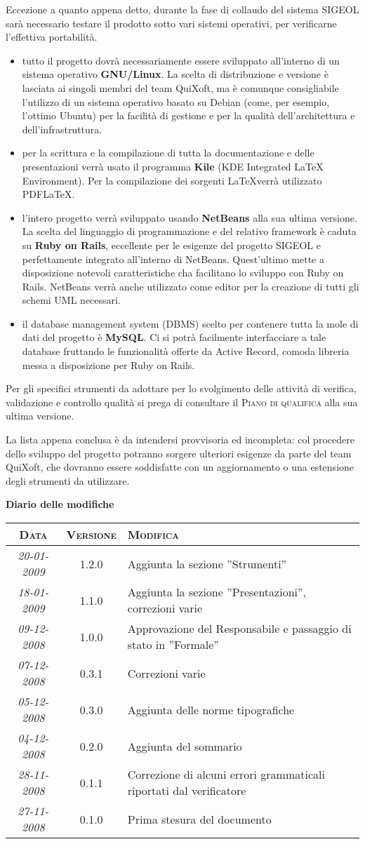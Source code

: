 \documentclass[11pt,a4paper]{article}
\newcommand{\modifiche} 
{
\newpage
\begin{center}
\textbf{Diario delle modifiche} \\
\bigskip
\begin{tabular}{|c|c|p{0.62\textwidth}|}
\hline
\textsc{Data} & \textsc{Versione} & \textsc{Modifica} \\
\hline
\hline
\textit{20-01-2009} & 1.2.0 & Aggiunta la sezione ''Strumenti''\\
\hline
\textit{18-01-2009} & 1.1.0 & Aggiunta la sezione ''Presentazioni'', correzioni varie\\
\hline
\textit{09-12-2008} & 1.0.0 & Approvazione del Responsabile e passaggio di stato in ''Formale''\\
\hline
\textit{07-12-2008} & 0.3.1 & Correzioni varie \\
\hline
\textit{05-12-2008} & 0.3.0 & Aggiunta delle norme tipografiche \\
\hline
\textit{04-12-2008} & 0.2.0 & Aggiunta del sommario \\
\hline
\textit{28-11-2008} & 0.1.1 & Correzione di alcuni errori grammaticali riportati dal verificatore \\
\hline
\textit{27-11-2008} & 0.1.0 & Prima stesura del documento \\
\hline
\end{tabular}
\end{center}
}
\begin{document}
Eccezione a quanto appena detto, durante la fase di collaudo del sistema SIGEOL sarà necessario testare il prodotto sotto vari sistemi operativi, per verificarne l'effettiva portabilità.
\begin{itemize}
 \item tutto il progetto dovrà necessariamente essere sviluppato all'interno di un sistema operativo \textbf{GNU/Linux}. La scelta di distribuzione e versione è lasciata ai singoli membri del team QuiXoft, ma è comunque consigliabile l'utilizzo di un sistema operativo basato su Debian (come, per esempio, l'ottimo Ubuntu) per la facilità di gestione e per la qualità dell'architettura e dell'infrastruttura.
 \item per la scrittura e la compilazione di tutta la documentazione e delle presentazioni verrà usato il programma \textbf{Kile} (KDE Integrated LaTeX Environment). Per la compilazione dei sorgenti \LaTeX \space verrà utilizzato PDFLaTeX.
 \item l'intero progetto verrà sviluppato usando \textbf{NetBeans} alla sua ultima versione. La scelta del linguaggio di programmazione e del relativo framework è caduta su \textbf{Ruby on Rails}, eccellente per le esigenze del progetto SIGEOL e perfettamente integrato all'interno di NetBeans. Quest'ultimo mette a disposizione notevoli caratteristiche cha facilitano lo sviluppo con Ruby on Rails. NetBeans verrà anche utilizzato come editor per la creazione di tutti gli schemi UML necessari.
 \item il database management system (DBMS) scelto per contenere tutta la mole di dati del progetto è \textbf{MySQL}. Ci si potrà facilmente interfacciare a tale database fruttando le funzionalità offerte da Active Record, comoda libreria messa a disposizione per Ruby on Rails.
\end{itemize}

Per gli specifici strumenti da adottare per lo svolgimento delle attività di verifica, validazione e controllo qualità si prega di consultare il \textsc{Piano di qualifica} alla sua ultima versione.

La lista appena conclusa è da intendersi provvisoria ed incompleta: col procedere dello sviluppo del progetto potranno sorgere ulteriori esigenze da parte del team QuiXoft, che dovranno essere soddisfatte con un aggiornamento o una estensione degli strumenti da utilizzare.


\modifiche
\end{document}
